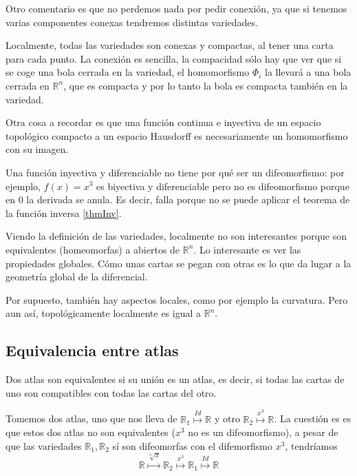 Otro comentario es que no perdemos nada por pedir conexión, ya que si tenemos varias componentes conexas tendremos distintas variedades.

Localmente, todas las variedades son conexas y compactas, al tener una carta para cada punto. La conexión es sencilla, la compacidad sólo hay que ver que si se coge una bola cerrada en la variedad, el homomorfismo $Φ_i$ la llevará a una bola cerrada en $ℝ^n$, que es compacta y por lo tanto la bola es compacta también en la variedad.

Otra cosa a recordar es que una función continua e inyectiva de un espacio topológico compacto a un espacio Hausdorff es necesariamente un homomorfismo con su imagen.

Una función inyectiva y diferenciable no tiene por qué ser un difeomorfismo: por ejemplo, $f(x) = x^3$ es biyectiva y diferenciable pero no es difeomorfismo porque en $0$ la derivada se anula. Es decir, falla porque no se puede aplicar el teorema de la función inversa \eqref{thmInv}.

Viendo la definición de las variedades, localmente no son interesantes porque son equivalentes (homeomorfas) a abiertos de $ℝ^n$. Lo interesante es ver las propiedades globales. Cómo unas cartas se pegan con otras es lo que da lugar a la geometría global de la diferencial.

Por supuesto, también hay aspectos locales, como por ejemplo la curvatura. Pero aun así, topológicamente localmente es igual a $ℝ^n$.

\subsection{Equivalencia entre atlas}

\begin{defn}\label{defAtlasEquiv} Dos atlas son equivalentes si su unión es un atlas, es decir, si todas las cartas de uno son compatibles con todas las cartas del otro.
\end{defn}

Tomemos dos atlas, uno que nos lleva de $ℝ_1 \overset{Id}{\longmapsto} ℝ$ y otro $ℝ_2 \overset{x^3}{\longmapsto} ℝ$. La cuestión es es que estos dos atlas no son equivalentes ($x^3$ no es un difeomorfismo), a pesar de que las variedades $ℝ_1, ℝ_2$ sí son difeomorfas con el difemorfismo $x^3$, tendríamos \[ ℝ \overset{\sqrt[3]{x}}{\longmapsto} ℝ_2 \overset{x^3}{\longmapsto} ℝ_1 \overset{Id}{\longmapsto} ℝ \]



